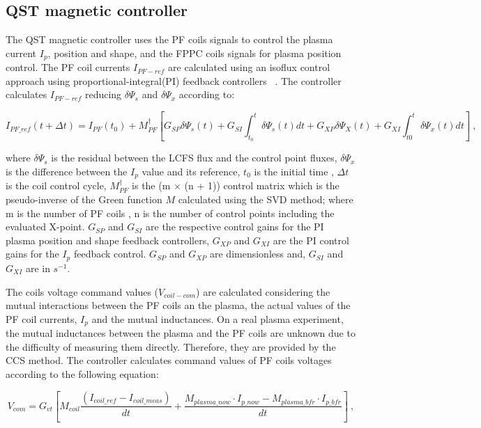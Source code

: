 \subsection{QST magnetic controller }


The QST magnetic controller  uses the PF coils signals to control the plasma current $I_p$, position and shape, and the FPPC coils signals for plasma position control. The PF coil currents $I_{PF-ref}$ are calculated using an isoflux control approach using proportional-integral(PI) feedback controllers   ~\cite{FBC}. The controller calculates $I_{PF-ref}$ reducing $\delta\Psi_s$ and $\delta\Psi_x$ according to:



\begin{equation}
I_{PF\_ref}(t+\Delta t) = I_{PF}(t_0)+M^\dagger_{PF}\left[G_{SP}\delta\Psi_s(t)+G_{SI}\int_{t_0}^{t}\delta\Psi_s(t)dt+G_{XP}\delta\Psi_X(t)+G_{XI}\int_{t0}^{t}\delta\Psi_x(t)dt\right]~,
\end{equation}

where $\delta\Psi_s$ is the residual between the  LCFS flux and the control point fluxes,   $\delta\Psi_x$ is the difference between the $I_p$ value and its reference, $t_0$ is the initial time , $\Delta t$ is the coil control cycle, $M^\dagger_{PF}$ is the (m $\times$ (n + 1)) control matrix which is the pseudo-inverse of the Green function $M$ calculated using the SVD method; where m is the number of PF coils , n is the number of control points including the evaluated X-point. $G_{SP}$ and $G_{SI}$ are the respective control gains for the PI plasma position and shape feedback controllers, $ G_{XP}$ and $G_{XI}$ are the PI control gains for the $I_p$ feedback control. $G_{SP}$ and $G_{XP}$ are dimensionless and, $G_{SI}$ and  $G_{XI}$ are in $s^{-1}$. \smallskip



The coils voltage command values ($V_{coil-com}$) are calculated considering the mutual interactions between the PF coils an the plasma, the actual values of the PF coil currents, $I_p$ and the mutual inductances. On a real plasma experiment, the  mutual inductances between the plasma and the PF coils are unknown due to the difficulty of measuring them directly. Therefore, they are provided by the CCS method. The controller calculates command values of PF coils voltages according to the following equation:



\begin{equation}
V_{com}=G_{vt}\left[M_{coil}\frac{(I_{coil\_ref}-I_{coil\_meas})}{dt}+ \frac{M_{plasma\_now} \cdot I_{p\_now} - M_{plasma\_ bfr} \cdot I_{p\_bfr}}{dt}\right]~,
\end{equation}

